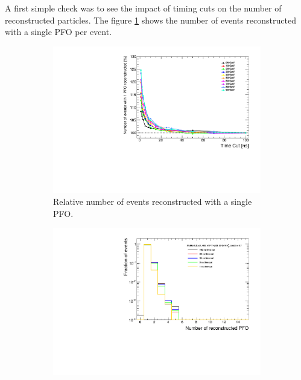 A first simple check was to see the impact of timing cuts on the number of reconstructed particles. The figure \ref{fig:EventRecoPFO} shows the number of events reconstructed with a single PFO per event.

\begin{figure}[htbp!]
  \centering
  \begin{subfigure}[t]{0.49\textwidth}
    \centering
    \includegraphics[width=1\linewidth]{../Thesis_Plots/ILD/NoSmearing/Plots/NumberEvents_PFO_TimeCuts_noSmearing}
    \caption{Relative number of events reconstructed with a single PFO.} \label{fig:EventRecoPFO}
  \end{subfigure}
  \hfill
  \begin{subfigure}[t]{0.49\textwidth}
    \centering
    \includegraphics[width=1\linewidth]{../Thesis_Plots/ILD/AdditionalPlots/Plots/NumberReconstructedPFO_TimeCuts_50GeV}

\end{subfigure}
\end{figure}
